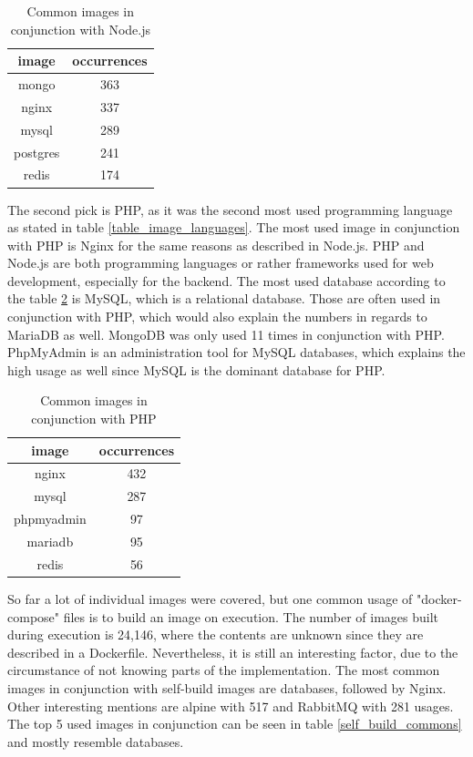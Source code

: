 \begin{table}[h!]
    \centering
    \begin{tabular}{ |c|c| }
    \hline
    image & occurrences \\
    \hline
         mongo & 363 \\
         nginx & 337 \\
         mysql & 289 \\
         postgres & 241 \\
         redis & 174 \\
    \hline
    \end{tabular}
    \caption{Common images in conjunction with Node.js}
    \label{node_commons}
\end{table}

The second pick is PHP, as it was the second most used programming language as stated in table \ref{table_image_languages}. The most used image in conjunction with PHP is Nginx for the same reasons as described in Node.js. PHP and Node.js are both programming languages or rather frameworks used for web development, especially for the backend. The most used database according to the table \ref{php_commons} is MySQL, which is a relational database. Those are often used in conjunction with PHP, which would also explain the numbers in regards to MariaDB as well. MongoDB was only used 11 times in conjunction with PHP. PhpMyAdmin is an administration tool for MySQL databases, which explains the high usage as well since MySQL is the dominant database for PHP.

\begin{table}[]
    \centering
    \begin{tabular}{ |c|c| }
    \hline
    image & occurrences \\
    \hline
         nginx & 432 \\
         mysql & 287 \\
         phpmyadmin & 97 \\
         mariadb & 95 \\
         redis & 56 \\
    \hline
    \end{tabular}
    \caption{Common images in conjunction with PHP}
    \label{php_commons}
\end{table}

So far a lot of individual images were covered, but one common usage of "docker-compose" files is to build an image on execution. The number of images built during execution is 24,146, where the contents are unknown since they are described in a Dockerfile. Nevertheless, it is still an interesting factor, due to the circumstance of not knowing parts of the implementation. The most common images in conjunction with self-build images are databases, followed by Nginx. Other interesting mentions are alpine with 517 and RabbitMQ with 281 usages. The top 5 used images in conjunction can be seen in table \ref{self_build_commons} and mostly resemble databases.

